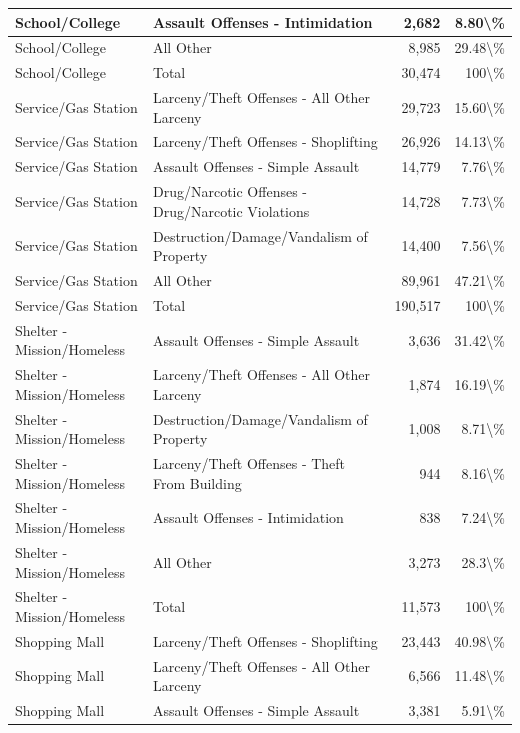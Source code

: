 \documentclass[
]{krantz}
\begin{document}
\begin{longtable}[t]{l|l|r|r}
\hline
School/College & Assault Offenses - Intimidation & 2,682 & 8.80\textbackslash{}\%\\
\hline
School/College & All Other & 8,985 & 29.48\textbackslash{}\%\\
\hline
School/College & Total & 30,474 & 100\textbackslash{}\%\\
\hline
Service/Gas Station & Larceny/Theft Offenses - All Other Larceny & 29,723 & 15.60\textbackslash{}\%\\
\hline
Service/Gas Station & Larceny/Theft Offenses - Shoplifting & 26,926 & 14.13\textbackslash{}\%\\
\hline
Service/Gas Station & Assault Offenses - Simple Assault & 14,779 & 7.76\textbackslash{}\%\\
\hline
Service/Gas Station & Drug/Narcotic Offenses - Drug/Narcotic Violations & 14,728 & 7.73\textbackslash{}\%\\
\hline
Service/Gas Station & Destruction/Damage/Vandalism of Property & 14,400 & 7.56\textbackslash{}\%\\
\hline
Service/Gas Station & All Other & 89,961 & 47.21\textbackslash{}\%\\
\hline
Service/Gas Station & Total & 190,517 & 100\textbackslash{}\%\\
\hline
Shelter - Mission/Homeless & Assault Offenses - Simple Assault & 3,636 & 31.42\textbackslash{}\%\\
\hline
Shelter - Mission/Homeless & Larceny/Theft Offenses - All Other Larceny & 1,874 & 16.19\textbackslash{}\%\\
\hline
Shelter - Mission/Homeless & Destruction/Damage/Vandalism of Property & 1,008 & 8.71\textbackslash{}\%\\
\hline
Shelter - Mission/Homeless & Larceny/Theft Offenses - Theft From Building & 944 & 8.16\textbackslash{}\%\\
\hline
Shelter - Mission/Homeless & Assault Offenses - Intimidation & 838 & 7.24\textbackslash{}\%\\
\hline
Shelter - Mission/Homeless & All Other & 3,273 & 28.3\textbackslash{}\%\\
\hline
Shelter - Mission/Homeless & Total & 11,573 & 100\textbackslash{}\%\\
\hline
Shopping Mall & Larceny/Theft Offenses - Shoplifting & 23,443 & 40.98\textbackslash{}\%\\
\hline
Shopping Mall & Larceny/Theft Offenses - All Other Larceny & 6,566 & 11.48\textbackslash{}\%\\
\hline
Shopping Mall & Assault Offenses - Simple Assault & 3,381 & 5.91\textbackslash{}\%\\

\end{longtable}
\end{document}
